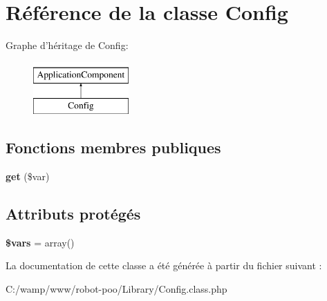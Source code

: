 \hypertarget{class_library_1_1_config}{\section{Référence de la classe Config}
\label{class_library_1_1_config}
}
Graphe d'héritage de Config\+:\begin{figure}[H]
\begin{center}
\leavevmode
\includegraphics[height=2.000000cm]{class_library_1_1_config}
\end{center}
\end{figure}
\subsection*{Fonctions membres publiques}
\begin{DoxyCompactItemize}
\item 
\hypertarget{class_library_1_1_config_afeac3b78eb982e758740b551ce3617fb}{{\bfseries get} (\$var)}\label{class_library_1_1_config_afeac3b78eb982e758740b551ce3617fb}

\end{DoxyCompactItemize}
\subsection*{Attributs protégés}
\begin{DoxyCompactItemize}
\item 
\hypertarget{class_library_1_1_config_a09f2c833c130b4443725fb576d9d5269}{{\bfseries \$vars} = array()}\label{class_library_1_1_config_a09f2c833c130b4443725fb576d9d5269}

\end{DoxyCompactItemize}


La documentation de cette classe a été générée à partir du fichier suivant \+:\begin{DoxyCompactItemize}
\item 
C\+:/wamp/www/robot-\/poo/\+Library/Config.\+class.\+php\end{DoxyCompactItemize}
